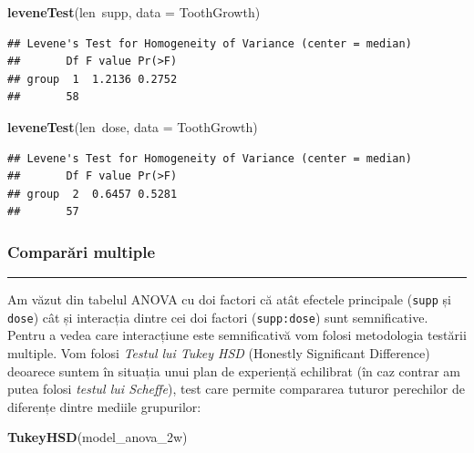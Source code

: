 \documentclass[]{article}
\newenvironment{Shaded}{\begin{snugshade}}{\end{snugshade}}
\newcommand{\KeywordTok}[1]{\textcolor[rgb]{0.13,0.29,0.53}{\textbf{{#1}}}}
\newcommand{\DataTypeTok}[1]{\textcolor[rgb]{0.13,0.29,0.53}{{#1}}}
\newcommand{\NormalTok}[1]{{#1}}
\begin{document}
\begin{Shaded}
\begin{Highlighting}[]
\KeywordTok{leveneTest}\NormalTok{(len~supp, }\DataTypeTok{data =} \NormalTok{ToothGrowth)}
\end{Highlighting}
\end{Shaded}

\begin{verbatim}
## Levene's Test for Homogeneity of Variance (center = median)
##       Df F value Pr(>F)
## group  1  1.2136 0.2752
##       58
\end{verbatim}

\begin{Shaded}
\begin{Highlighting}[]
\KeywordTok{leveneTest}\NormalTok{(len~dose, }\DataTypeTok{data =} \NormalTok{ToothGrowth)}
\end{Highlighting}
\end{Shaded}

\begin{verbatim}
## Levene's Test for Homogeneity of Variance (center = median)
##       Df F value Pr(>F)
## group  2  0.6457 0.5281
##       57
\end{verbatim}

\subsubsection{Comparări multiple}\label{comparari-multiple-1}

\begin{center}\rule{0.5\linewidth}{\linethickness}\end{center}

Am văzut din tabelul ANOVA cu doi factori că atât efectele principale
(\texttt{supp} și \texttt{dose}) cât și interacția dintre cei doi
factori (\texttt{supp:dose}) sunt semnificative. Pentru a vedea care
interacțiune este semnificativă vom folosi metodologia testării
multiple. Vom folosi \emph{Testul lui Tukey HSD} (Honestly Significant
Difference) deoarece suntem în situația unui plan de experiență
echilibrat (în caz contrar am putea folosi \emph{testul lui Scheffe}),
test care permite compararea tuturor perechilor de diferențe dintre
mediile grupurilor:

\begin{Shaded}
\begin{Highlighting}[]
\KeywordTok{TukeyHSD}\NormalTok{(model_anova_2w)}
\end{Highlighting}
\end{Shaded}
\end{document}
